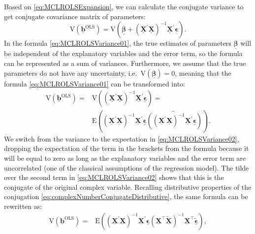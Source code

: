 \documentclass[
]{book}
\begin{document}
Based on \eqref{eq:MCLROLSExpansion}, we can calculate the conjugate variance to get conjugate covariance matrix of parameters:
\begin{equation}
    \mathrm{V}\left( \underline{\boldsymbol{b}}^{\text{OLS}} \right) = \mathrm{V}\left( \underline{\boldsymbol{\beta}} + \left( \underline{\mathbf{X}}^\prime \underline{\mathbf{X}} \right)^{-1} \underline{\mathbf{X}}^\prime \underline{\boldsymbol{\epsilon}} \right) .
    \label{eq:MCLROLSVariance01}
\end{equation}
In the formula \eqref{eq:MCLROLSVariance01}, the true estimates of parameters \(\underline{\boldsymbol{\beta}}\) will be independent of the explanatory variables and the error term, so the formula can be represented as a sum of variances. Furthermore, we assume that the true parameters do not have any uncertainty, i.e.~\(\mathrm{V}\left( \underline{\boldsymbol{\beta}} \right) = 0\), meaning that the formula \eqref{eq:MCLROLSVariance01} can be transformed into:
\begin{equation}
    \begin{aligned}
        \mathrm{V}\left( \underline{\boldsymbol{b}}^{\text{OLS}} \right) =
        & \mathrm{V}\left(\left( \underline{\mathbf{X}}^\prime \underline{\mathbf{X}} \right)^{-1} \underline{\mathbf{X}}^\prime \underline{\boldsymbol{\epsilon}} \right) = \\
        & \mathrm{E}\left( \left( \underline{\mathbf{X}}^\prime \underline{\mathbf{X}} \right)^{-1} \underline{\mathbf{X}}^\prime \underline{\boldsymbol{\epsilon}} \widetilde{ \left( \left( \underline{\mathbf{X}}^\prime \underline{\mathbf{X}} \right)^{-1} \underline{\mathbf{X}}^\prime \underline{\boldsymbol{\epsilon}}\right)} \right) .
    \end{aligned}
    \label{eq:MCLROLSVariance02}
\end{equation}
We switch from the variance to the expectation in \eqref{eq:MCLROLSVariance02}, dropping the expectation of the term in the brackets from the formula because it will be equal to zero as long as the explanatory variables and the error term are uncorrelated (one of the classical assumptions of the regression model). The tilde over the second term in \eqref{eq:MCLROLSVariance02} shows that this is the conjugate of the original complex variable. Recalling distributive properties of the conjugation \eqref{eq:complexNumberConjugateDistributive}, the same formula can be rewritten as:
\begin{equation}
    \begin{aligned}
        \mathrm{V}\left( \underline{\boldsymbol{b}}^{\text{OLS}} \right) =
        & \mathrm{E}\left( \left( \underline{\mathbf{X}}^\prime \underline{\mathbf{X}} \right)^{-1} \underline{\mathbf{X}}^\prime \underline{\boldsymbol{\epsilon}} \left( \underline{\mathbf{X}}^\top \tilde{\underline{\mathbf{X}}} \right)^{-1} \underline{\mathbf{X}}^\top \tilde{\underline{\boldsymbol{\epsilon}}} \right) ,
    \end{aligned}
    \label{eq:MCLROLSVariance03}
\end{equation}
\end{document}
